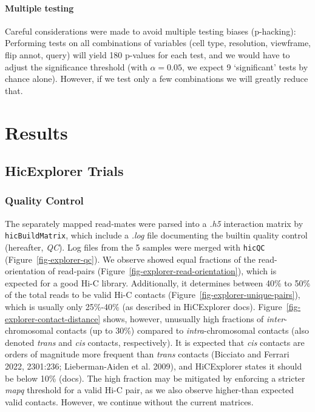 \documentclass[
  11pt,
  a4paper,
]{scrbook}
\let\oldemph\emph
\renewcommand\emph[1]{\oldemph{\color{gray}#1}}
\begin{document}
\subsubsection{Multiple testing}\label{multiple-testing}

Careful considerations were made to avoid multiple testing biases
(p-hacking): Performing tests on all combinations of variables (cell
type, resolution, viewframe, flip annot, query) will yield 180 p-values
for each test, and we would have to adjust the significance threshold
(with \(\alpha = 0.05\), we expect 9 `significant' tests by chance
alone). However, if we test only a few combinations we will greatly
reduce that.

\chapter{Results}\label{results}

\section{HicExplorer Trials}\label{hicexplorer-trials-1}

\subsection{Quality Control}\label{quality-control}

The separately mapped read-mates were parsed into a \emph{.h5}
interaction matrix by \texttt{hicBuildMatrix}, which include a
\emph{.log} file documenting the builtin quality control (hereafter,
\emph{QC}). Log files from the 5 samples were merged with \texttt{hicQC}
(Figure~\ref{fig-explorer-qc}). We observe showed equal fractions of the
read-orientation of read-pairs
(Figure~\ref{fig-explorer-read-orientation}), which is expected for a
good Hi-C library. Additionally, it determines between 40\% to 50\% of
the total reads to be valid Hi-C contacts
(Figure~\ref{fig-explorer-unique-pairs}), which is usually only
25\%-40\% (as described in HiCExplorer docs).
Figure~\ref{fig-explorer-contact-distance} shows, however, unusually
high fractions of \emph{inter}-chromosomal contacts (up to 30\%)
compared to \emph{intra}-chromosomal contacts (also denoted \emph{trans}
and \emph{cis} contacts, respectively). It is expected that \emph{cis}
contacts are orders of magnitude more frequent than \emph{trans}
contacts (Bicciato and Ferrari 2022, 2301:236; Lieberman-Aiden et al.
2009), and HiCExplorer states it should be below 10\% (docs). The high
fraction may be mitigated by enforcing a stricter \emph{mapq} threshold
for a valid Hi-C pair, as we also observe higher-than expected valid
contacts. However, we continue without the current matrices.
\end{document}
